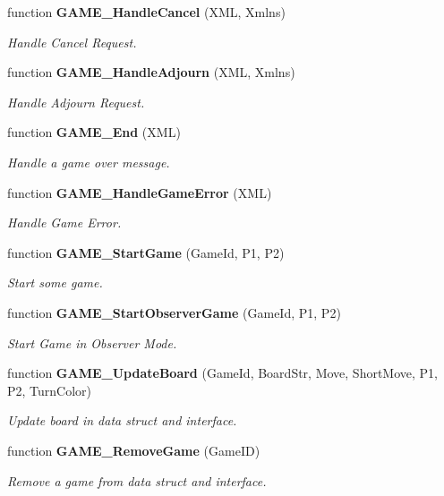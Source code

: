 \begin{CompactItemize}
function {\bf GAME\_\-HandleCancel} (XML, Xmlns)
\begin{CompactList}\small\item\em Handle Cancel Request. \item\end{CompactList}\item 
function {\bf GAME\_\-HandleAdjourn} (XML, Xmlns)
\begin{CompactList}\small\item\em Handle Adjourn Request. \item\end{CompactList}\item 
function {\bf GAME\_\-End} (XML)
\begin{CompactList}\small\item\em Handle a game over message. \item\end{CompactList}\item 
function {\bf GAME\_\-HandleGameError} (XML)
\begin{CompactList}\small\item\em Handle Game Error. \item\end{CompactList}\item 
function {\bf GAME\_\-StartGame} (GameId, P1, P2)
\begin{CompactList}\small\item\em Start some game. \item\end{CompactList}\item 
function {\bf GAME\_\-StartObserverGame} (GameId, P1, P2)
\begin{CompactList}\small\item\em Start Game in Observer Mode. \item\end{CompactList}\item 
function {\bf GAME\_\-UpdateBoard} (GameId, BoardStr, Move, ShortMove, P1, P2, TurnColor)
\begin{CompactList}\small\item\em Update board in data struct and interface. \item\end{CompactList}\item 
function {\bf GAME\_\-RemoveGame} (GameID)
\begin{CompactList}\small\item\em Remove a game from data struct and interface. \item\end{CompactList}\item 

\end{CompactItemize}
